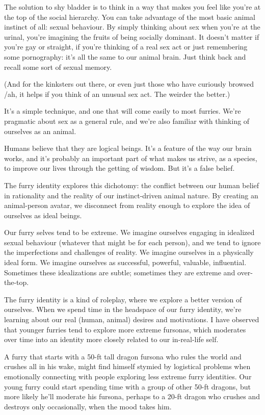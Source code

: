 The solution to shy bladder is to think in a way that makes you feel like you're at the top of the social hierarchy. You can take advantage of the most basic animal instinct of all: sexual behaviour. By simply thinking about sex when you're at the urinal, you're imagining the fruits of being socially dominant. It doesn't matter if you're gay or straight, if you're thinking of a real sex act or just remembering some pornography: it's all the same to our animal brain. Just think back and recall some sort of sexual memory.

(And for the kinksters out there, or even just those who have curiously browsed /ah, it helps if you think of an unusual sex act. The weirder the better.)

It's a simple technique, and one that will come easily to most furries. We're pragmatic about sex as a general rule, and we're also familiar with thinking of ourselves as an animal.

Humans believe that they are logical beings. It's a feature of the way our brain works, and it's probably an important part of what makes us strive, as a species, to improve our lives through the getting of wisdom. But it's a false belief.

The furry identity explores this dichotomy: the conflict between our human belief in rationality and the reality of our instinct-driven animal nature. By creating an animal-person avatar, we disconnect from reality enough to explore the idea of ourselves as ideal beings.

Our furry selves tend to be extreme. We imagine ourselves engaging in idealized sexual behaviour (whatever that might be for each person), and we tend to ignore the imperfections and challenges of reality. We imagine ourselves in a physically ideal form. We imagine ourselves as successful, powerful, valuable, influential. Sometimes these idealizations are subtle; sometimes they are extreme and over-the-top.

The furry identity is a kind of roleplay, where we explore a better version of ourselves. When we spend time in the headspace of our furry identity, we're learning about our real (human, animal) desires and motivations. I have observed that younger furries tend to explore more extreme fursonas, which moderates over time into an identity more closely related to our in-real-life self.

A furry that starts with a 50-ft tall dragon fursona who rules the world and crushes all in his wake, might find himself stymied by logistical problems when emotionally connecting with people exploring less extreme furry identities. Our young furry could start spending time with a group of other 50-ft dragons, but more likely he'll moderate his fursona, perhaps to a 20-ft dragon who crushes and destroys only occasionally, when the mood takes him.

